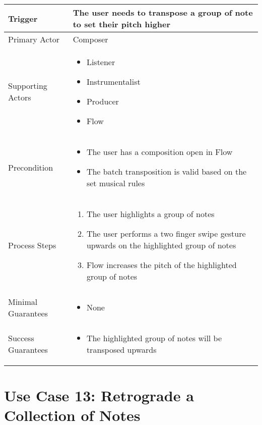  \begin{tabularx}{\textwidth}{|X|X|}
  \hline
  Trigger & 
  The user needs to transpose a group of note to set their pitch higher \\
  \hline
  Primary Actor & 
  Composer \\
  \hline
  Supporting Actors & 
  \begin{itemize}
  \item Listener
  \item Instrumentalist
  \item Producer
  \item Flow
  \end{itemize} \\
  \hline
  Precondition & 
  \begin{itemize}
  \item The user has a composition open in Flow
  \item The batch transposition is valid based on the set musical rules
  \end{itemize} \\
  \hline
  Process Steps & 
  \begin{enumerate}
  \item The user highlights a group of notes
  \item The user performs a two finger swipe gesture upwards on the highlighted group of notes
  \item Flow increases the pitch of the highlighted group of notes
  \end{enumerate} \\
  \hline
  Minimal Guarantees & 
  \begin{itemize}
    \item None
  \end{itemize} \\
  \hline
  Success Guarantees & 
  \begin{itemize}
    \item The highlighted group of notes will be transposed upwards
  \end{itemize} \\
  \hline
  \end{tabularx}


  \section{Use Case 13: Retrograde a Collection of Notes}

